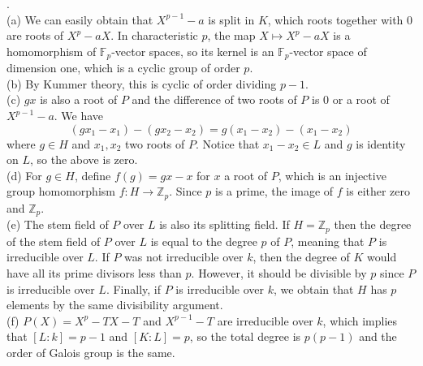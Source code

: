 \documentclass[11pt,a4paper]{ctexart}
\begin{document}
.\\
(a) We can easily obtain that $X^{p-1}-a$ is split in $K$, which roots together with 0 are roots of $X^p-aX$. In characteristic $p$, the map $X\mapsto X^p-aX$ is a homomorphism of $\mathbb{F}_p$-vector spaces, so its kernel is an $\mathbb{F}_p$-vector space of dimension one, which is a cyclic group of order $p$.\\
(b) By Kummer theory, this is cyclic of order dividing $p-1$.\\
(c) $gx$ is also a root of $P$ and the difference of two roots of $P$ is 0 or a root of $X^{p-1}-a$. We have
$$(gx_1-x_1)-(gx_2-x_2)=g(x_1-x_2)-(x_1-x_2)$$
where $g\in H$ and $x_1,x_2$ two roots of $P$. Notice that $x_1-x_2\in L$ and $g$ is identity on $L$, so the above is zero.\\
(d) For $g\in H$, define $f(g)=gx-x$ for $x$ a root of $P$, which is an injective group homomorphism $f:H\rightarrow\mathbb{Z}_p$.
Since $p$ is a prime, the image of $f$ is either zero and $\mathbb{Z}_p$.\\
(e) The stem field of $P$ over $L$ is also its splitting field. If $H=\mathbb{Z}_p$ then the degree of the stem field of $P$ over $L$ is equal to the degree $p$ of $P$, meaning that $P$ is irreducible over $L$. If $P$ was not irreducible over $k$, then the degree of $K$ would have all its prime divisors less than $p$. However, it should be divisible by $p$ since $P$ is irreducible over $L$. Finally, if $P$ is irreducible over $k$, we obtain that $H$ has $p$ elements by the same divisibility argument.\\
(f) $P(X)=X^p-TX-T$ and $X^{p-1}-T$ are irreducible over $k$, which implies that $[L:k]=p-1$ and $[K:L]=p$, so the total degree is $p(p-1)$ and the order of Galois group is the same.
\end{document}
